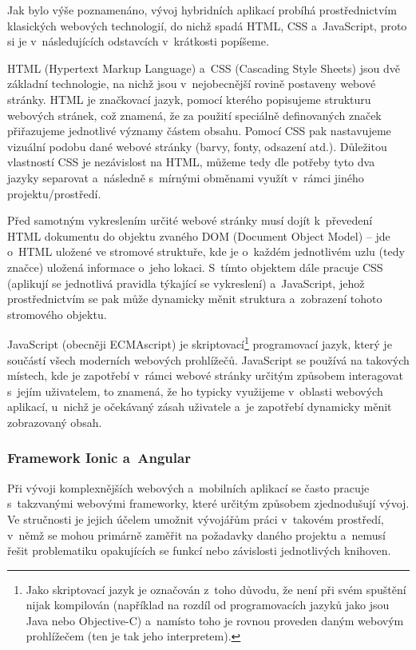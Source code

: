 Jak bylo výše poznamenáno, vývoj hybridních aplikací probíhá
prostřednictvím klasických webových technologií, do nichž spadá HTML,
CSS a~JavaScript, proto si je v~následujících odstavcích v~krátkosti
popíšeme.

HTML (Hypertext Markup Language) a~CSS (Cascading Style Sheets) jsou dvě
základní technologie, na nichž jsou v~nejobecnější rovině postaveny
webové stránky. HTML je značkovací jazyk, pomocí kterého popisujeme
strukturu webových stránek, což znamená, že za použití speciálně
definovaných značek přiřazujeme jednotlivé významy částem obsahu. Pomocí
CSS pak nastavujeme vizuální podobu dané webové stránky (barvy, fonty,
odsazení atd.). Důležitou vlastností CSS je nezávislost na HTML, můžeme
tedy dle potřeby tyto dva jazyky separovat a~následně s~mírnými obměnami
využít v~rámci jiného projektu/prostředí.~\parencite{htmlcss}

Před samotným vykreslením určité webové stránky musí dojít k~převedení
HTML dokumentu do objektu zvaného DOM (Document Object Model) -- jde
o~HTML uložené ve stromové struktuře, kde je o~každém jednotlivém uzlu
(tedy značce) uložená informace o~jeho lokaci. S~tímto objektem dále
pracuje CSS (aplikují se jednotlivá pravidla týkající se vykreslení)
a~JavaScript, jehož prostřednictvím se pak může dynamicky měnit struktura
a~zobrazení tohoto stromového objektu.~\parencite{howbrowserswork}

JavaScript (obecněji ECMAscript) je
skriptovací\footnote{Jako skriptovací jazyk je označován z~toho důvodu, že není při svém spuštění nijak kompilován (například na rozdíl od programovacích jazyků jako jsou Java nebo Objective-C) a~namísto toho je rovnou proveden daným webovým prohlížečem (ten je tak jeho interpretem).}
programovací jazyk, který je součástí všech moderních webových
prohlížečů. JavaScript se používá na takových místech, kde je zapotřebí
v~rámci webové stránky určitým způsobem interagovat s~jejím uživatelem,
to znamená, že ho typicky využijeme v~oblasti webových aplikací, u~nichž
je očekávaný zásah uživatele a~je zapotřebí dynamicky měnit zobrazovaný
obsah.~\parencite{javascript}

\hypertarget{framework-ionic-a-angular}{%
\subsubsection{Framework Ionic a~Angular}\label{framework-ionic-a-angular}}

Při vývoji komplexnějších webových a~mobilních aplikací se často pracuje
s~takzvanými webovými frameworky, které určitým způsobem zjednodušují
vývoj. Ve stručnosti je jejich účelem umožnit vývojářům práci v~takovém
prostředí, v~němž se mohou primárně zaměřit na požadavky daného projektu
a~nemusí řešit problematiku opakujících se funkcí nebo závislosti
jednotlivých knihoven.

